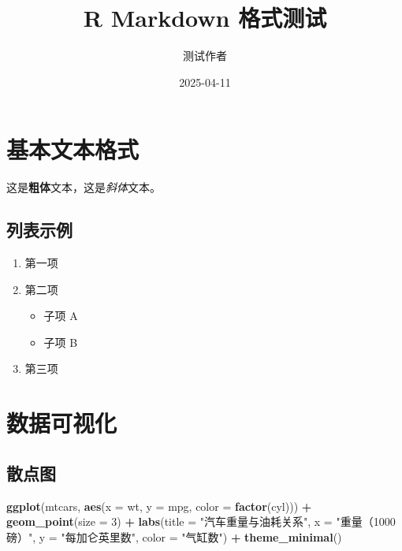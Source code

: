 \documentclass[
]{article}
\title{R Markdown 格式测试}
\author{测试作者}
\date{2025-04-11}
\newenvironment{Shaded}{\begin{snugshade}}{\end{snugshade}}
\newcommand{\AttributeTok}[1]{\textcolor[rgb]{0.13,0.29,0.53}{#1}}
\newcommand{\DecValTok}[1]{\textcolor[rgb]{0.00,0.00,0.81}{#1}}
\newcommand{\FunctionTok}[1]{\textcolor[rgb]{0.13,0.29,0.53}{\textbf{#1}}}
\newcommand{\NormalTok}[1]{#1}
\newcommand{\SpecialCharTok}[1]{\textcolor[rgb]{0.81,0.36,0.00}{\textbf{#1}}}
\newcommand{\StringTok}[1]{\textcolor[rgb]{0.31,0.60,0.02}{#1}}
\providecommand{\tightlist}{%
  \setlength{\itemsep}{0pt}\setlength{\parskip}{0pt}}
\begin{document}
\maketitle

{
\setcounter{tocdepth}{2}
\tableofcontents
}
\section{基本文本格式}\label{ux57faux672cux6587ux672cux683cux5f0f}

这是\textbf{粗体}文本，这是\emph{斜体}文本。

\subsection{列表示例}\label{ux5217ux8868ux793aux4f8b}

\begin{enumerate}
\def\labelenumi{\arabic{enumi}.}
\tightlist
\item
  第一项
\item
  第二项

  \begin{itemize}
  \tightlist
  \item
    子项 A
  \item
    子项 B
  \end{itemize}
\item
  第三项
\end{enumerate}

\section{数据可视化}\label{ux6570ux636eux53efux89c6ux5316}

\subsection{散点图}\label{ux6563ux70b9ux56fe}

\begin{Shaded}
\begin{Highlighting}[]
\FunctionTok{ggplot}\NormalTok{(mtcars, }\FunctionTok{aes}\NormalTok{(}\AttributeTok{x =}\NormalTok{ wt, }\AttributeTok{y =}\NormalTok{ mpg, }\AttributeTok{color =} \FunctionTok{factor}\NormalTok{(cyl))) }\SpecialCharTok{+}
  \FunctionTok{geom\_point}\NormalTok{(}\AttributeTok{size =} \DecValTok{3}\NormalTok{) }\SpecialCharTok{+}
  \FunctionTok{labs}\NormalTok{(}\AttributeTok{title =} \StringTok{"汽车重量与油耗关系"}\NormalTok{,}
       \AttributeTok{x =} \StringTok{"重量（1000磅）"}\NormalTok{,}
       \AttributeTok{y =} \StringTok{"每加仑英里数"}\NormalTok{,}
       \AttributeTok{color =} \StringTok{"气缸数"}\NormalTok{) }\SpecialCharTok{+}
  \FunctionTok{theme\_minimal}\NormalTok{()}
\end{Highlighting}
\end{Shaded}
\end{document}
